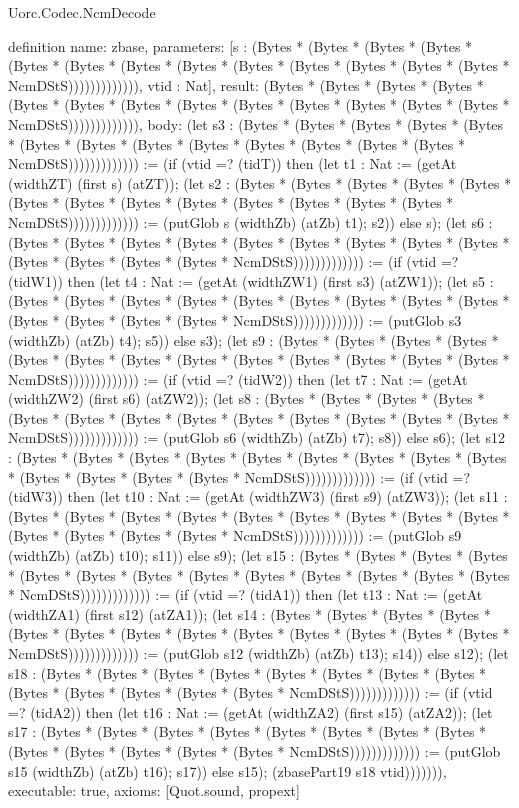 \begin{lexlean}{Uorc.Codec.NcmDecode}
\begin{semanticmodule}
definition{
  name: zbase,
  parameters: [s : (Bytes * (Bytes * (Bytes * (Bytes * (Bytes * (Bytes * (Bytes * (Bytes * (Bytes * (Bytes * (Bytes * (Bytes * (Bytes * NcmDStS))))))))))))), vtid : Nat],
  result: (Bytes * (Bytes * (Bytes * (Bytes * (Bytes * (Bytes * (Bytes * (Bytes * (Bytes * (Bytes * (Bytes * (Bytes * (Bytes * NcmDStS))))))))))))),
  body: (let s3 : (Bytes * (Bytes * (Bytes * (Bytes * (Bytes * (Bytes * (Bytes * (Bytes * (Bytes * (Bytes * (Bytes * (Bytes * (Bytes * NcmDStS))))))))))))) := (if (vtid =? (tidT)) then (let t1 : Nat := (getAt (widthZT) (first s) (atZT)); (let s2 : (Bytes * (Bytes * (Bytes * (Bytes * (Bytes * (Bytes * (Bytes * (Bytes * (Bytes * (Bytes * (Bytes * (Bytes * (Bytes * NcmDStS))))))))))))) := (putGlob s (widthZb) (atZb) t1); s2)) else s); (let s6 : (Bytes * (Bytes * (Bytes * (Bytes * (Bytes * (Bytes * (Bytes * (Bytes * (Bytes * (Bytes * (Bytes * (Bytes * (Bytes * NcmDStS))))))))))))) := (if (vtid =? (tidW1)) then (let t4 : Nat := (getAt (widthZW1) (first s3) (atZW1)); (let s5 : (Bytes * (Bytes * (Bytes * (Bytes * (Bytes * (Bytes * (Bytes * (Bytes * (Bytes * (Bytes * (Bytes * (Bytes * (Bytes * NcmDStS))))))))))))) := (putGlob s3 (widthZb) (atZb) t4); s5)) else s3); (let s9 : (Bytes * (Bytes * (Bytes * (Bytes * (Bytes * (Bytes * (Bytes * (Bytes * (Bytes * (Bytes * (Bytes * (Bytes * (Bytes * NcmDStS))))))))))))) := (if (vtid =? (tidW2)) then (let t7 : Nat := (getAt (widthZW2) (first s6) (atZW2)); (let s8 : (Bytes * (Bytes * (Bytes * (Bytes * (Bytes * (Bytes * (Bytes * (Bytes * (Bytes * (Bytes * (Bytes * (Bytes * (Bytes * NcmDStS))))))))))))) := (putGlob s6 (widthZb) (atZb) t7); s8)) else s6); (let s12 : (Bytes * (Bytes * (Bytes * (Bytes * (Bytes * (Bytes * (Bytes * (Bytes * (Bytes * (Bytes * (Bytes * (Bytes * (Bytes * NcmDStS))))))))))))) := (if (vtid =? (tidW3)) then (let t10 : Nat := (getAt (widthZW3) (first s9) (atZW3)); (let s11 : (Bytes * (Bytes * (Bytes * (Bytes * (Bytes * (Bytes * (Bytes * (Bytes * (Bytes * (Bytes * (Bytes * (Bytes * (Bytes * NcmDStS))))))))))))) := (putGlob s9 (widthZb) (atZb) t10); s11)) else s9); (let s15 : (Bytes * (Bytes * (Bytes * (Bytes * (Bytes * (Bytes * (Bytes * (Bytes * (Bytes * (Bytes * (Bytes * (Bytes * (Bytes * NcmDStS))))))))))))) := (if (vtid =? (tidA1)) then (let t13 : Nat := (getAt (widthZA1) (first s12) (atZA1)); (let s14 : (Bytes * (Bytes * (Bytes * (Bytes * (Bytes * (Bytes * (Bytes * (Bytes * (Bytes * (Bytes * (Bytes * (Bytes * (Bytes * NcmDStS))))))))))))) := (putGlob s12 (widthZb) (atZb) t13); s14)) else s12); (let s18 : (Bytes * (Bytes * (Bytes * (Bytes * (Bytes * (Bytes * (Bytes * (Bytes * (Bytes * (Bytes * (Bytes * (Bytes * (Bytes * NcmDStS))))))))))))) := (if (vtid =? (tidA2)) then (let t16 : Nat := (getAt (widthZA2) (first s15) (atZA2)); (let s17 : (Bytes * (Bytes * (Bytes * (Bytes * (Bytes * (Bytes * (Bytes * (Bytes * (Bytes * (Bytes * (Bytes * (Bytes * (Bytes * NcmDStS))))))))))))) := (putGlob s15 (widthZb) (atZb) t16); s17)) else s15); (zbasePart19 s18 vtid))))))),
  executable: true,
  axioms: [Quot.sound, propext]
}


\end{semanticmodule}
\end{lexlean}
